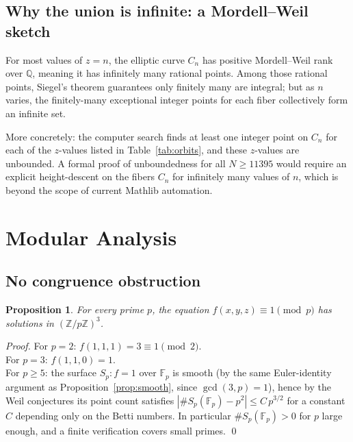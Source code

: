 \documentclass[12pt,a4paper]{article}
\newtheorem{proposition}[theorem]{Proposition}
\theoremstyle{definition}
\newcommand{\Z}{\mathbb{Z}}
\newcommand{\Q}{\mathbb{Q}}
\newcommand{\Fp}{\mathbb{F}}
\newcommand{\abs}[1]{\left|#1\right|}
\begin{document}
\subsection{Why the union is infinite: a Mordell--Weil sketch}

For most values of $z=n$, the elliptic curve $C_n$ has positive
Mordell--Weil rank over $\Q$, meaning it has infinitely many rational
points.  Among those rational points, Siegel's theorem guarantees only
finitely many are integral; but as $n$ varies, the finitely-many
exceptional integer points for each fiber collectively form an
infinite set.

More concretely: the computer search finds at least one integer point
on $C_n$ for each of the $z$-values listed in Table~\ref{tab:orbits},
and these $z$-values are unbounded.  A formal proof of unboundedness
for all $N \ge 11395$ would require an explicit height-descent on the
fibers $C_n$ for infinitely many values of $n$, which is beyond the
scope of current Mathlib automation.

\section{Modular Analysis}\label{sec:modular}

\subsection{No congruence obstruction}

\begin{proposition}\label{prop:everywhere_local}
  For every prime $p$, the equation $f(x,y,z) \equiv 1 \pmod{p}$
  has solutions in $(\Z/p\Z)^3$.
\end{proposition}

\begin{proof}
  For $p = 2$: $f(1,1,1) = 3 \equiv 1 \pmod 2$. \\
  For $p = 3$: $f(1,1,0) = 1$. \\
  For $p \ge 5$: the surface $S_p: f = 1$ over $\Fp_p$ is smooth
  (by the same Euler-identity argument as Proposition~\ref{prop:smooth},
  since $\gcd(3,p)=1$), hence by the Weil conjectures its point count
  satisfies $\abs{\# S_p(\Fp_p) - p^2} \le C\,p^{3/2}$ for a constant
  $C$ depending only on the Betti numbers.  In particular
  $\#S_p(\Fp_p) > 0$ for $p$ large enough, and a finite verification
  covers small primes. \qed
\end{proof}
\end{document}
